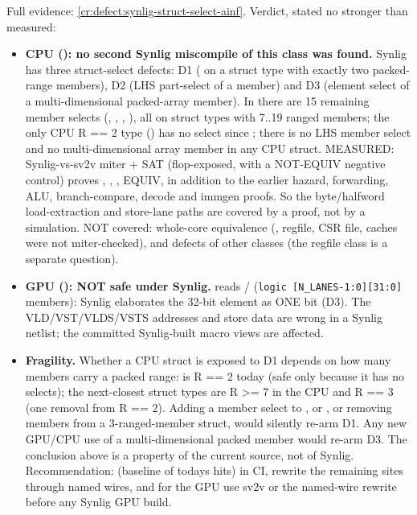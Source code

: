 \begin{record}

Full evidence: \cref{cr:defect:synlig-struct-select-ainf}. Verdict, stated
no stronger than measured:

\begin{itemize}
\tightlist
\item
  \textbf{CPU (): no second Synlig miscompile of this class
  was found.} Synlig has three struct-select defects: D1 (
  on a struct type with exactly two packed-range members), D2 (LHS
  part-select of a member) and D3 (element select of a multi-dimensional
  packed-array member). In  there are 15 remaining member
  selects (, , ,
  ), all on struct types with 7..19 ranged
  members; the only CPU R == 2 type () has no select
  since ; there is no LHS member select and no multi-dimensional
  array member in any CPU struct. MEASURED: Synlig-vs-sv2v miter + SAT
  (flop-exposed, with a NOT-EQUIV negative control) proves
  , , ,  EQUIV,
  in addition to the earlier hazard, forwarding, ALU, branch-compare,
  decode and immgen proofs. So the byte/\allowbreak{}halfword
  load-extraction and store-lane paths are covered by a proof, not by a
  simulation. NOT covered: whole-core equivalence (,
  regfile, CSR file, caches were not miter-checked), and defects of
  other classes (the  regfile  class is a
  separate question).
\item
  \textbf{GPU (): NOT safe under Synlig.}
   reads  /
  (\texttt{logic\ [N\_\allowbreak{}LANES-\allowbreak{}1:\allowbreak{}0][31:\allowbreak{}0]}
  members): Synlig elaborates the 32-bit element as ONE bit (D3). The
  VLD/\allowbreak{}VST/\allowbreak{}VLDS/\allowbreak{}VSTS addresses and
  store data are wrong in a Synlig netlist; the committed Synlig-built
   macro views are affected.
\item
  \textbf{Fragility.} Whether a CPU struct is exposed to D1 depends on
  how many members carry a packed range:  is R == 2
  today (safe only because it has no selects); the next-closest struct
  types are R \textgreater= 7 in the CPU and  R
  == 3 (one removal from R == 2). Adding a member select to
  ,  or , or
  removing members from a 3-ranged-member struct, would silently re-arm
  D1. Any new GPU/CPU use of a multi-dimensional packed member would
  re-arm D3. The conclusion above is a property of the current source,
  not of Synlig. Recommendation:
   (baseline of
  today\textquotesingle s hits) in CI, rewrite the remaining sites
  through named wires, and for the GPU use sv2v or the named-wire
  rewrite before any Synlig GPU build.
\end{itemize}

\end{record}

